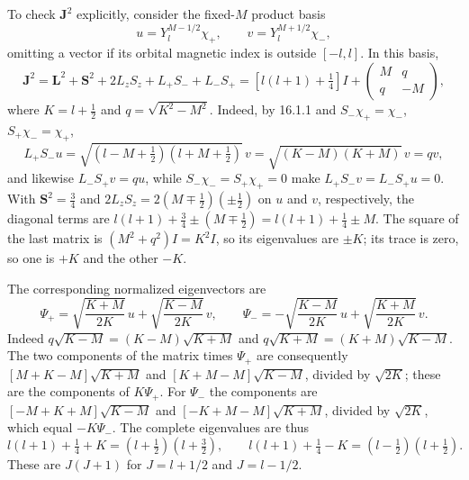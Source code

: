 To check $\mathbf J^2$ explicitly, consider the fixed-$M$ product basis
\[
u=Y_l^{M-1/2}\chi_+,\qquad
v=Y_l^{M+1/2}\chi_-,
\]
omitting a vector if its orbital magnetic index is outside $[-l,l]$.
In this basis,
\[
\mathbf J^2=\mathbf L^2+\mathbf S^2+2L_zS_z+L_+S_-+L_-S_+
=\left[l(l+1)+\tfrac14\right]I+
\begin{pmatrix}M&q\\q&-M\end{pmatrix},
\]
where $K=l+\tfrac12$ and $q=\sqrt{K^2-M^2}$.
Indeed, by 16.1.1 and $S_-\chi_+=\chi_-$, $S_+\chi_-=\chi_+$,
\[
L_+S_-u=\sqrt{(l-M+\tfrac12)(l+M+\tfrac12)}\,v=\sqrt{(K-M)(K+M)}\,v=qv,
\]
and likewise $L_-S_+v=qu$, while $S_-\chi_-=S_+\chi_+=0$ make
$L_+S_-v=L_-S_+u=0$. With $\mathbf S^2=\tfrac34$ and
$2L_zS_z=2(M\mp\tfrac12)(\pm\tfrac12)$ on $u$ and $v$, respectively,
the diagonal terms are
$l(l+1)+\tfrac34\pm(M\mp\tfrac12)=l(l+1)+\tfrac14\pm M$.
The square of the last matrix is
$(M^2+q^2)I=K^2I$, so its eigenvalues are $\pm K$; its trace is zero,
so one is $+K$ and the other $-K$.

The corresponding normalized eigenvectors are
\[
\Psi_+=\sqrt{\frac{K+M}{2K}}\,u+
\sqrt{\frac{K-M}{2K}}\,v,
\qquad
\Psi_-=-\sqrt{\frac{K-M}{2K}}\,u+
\sqrt{\frac{K+M}{2K}}\,v.
\]
Indeed $q\sqrt{K-M}=(K-M)\sqrt{K+M}$ and
$q\sqrt{K+M}=(K+M)\sqrt{K-M}$. The two components of the matrix
times $\Psi_+$ are consequently
$[M+K-M]\sqrt{K+M}$ and $[K+M-M]\sqrt{K-M}$,
divided by $\sqrt{2K}$; these are the components of $K\Psi_+$.
For $\Psi_-$ the components are
$[-M+K+M]\sqrt{K-M}$ and
$[-K+M-M]\sqrt{K+M}$, divided by $\sqrt{2K}$,
which equal $-K\Psi_-$.
The complete eigenvalues are thus
\[
l(l+1)+\tfrac14+K=(l+\tfrac12)(l+\tfrac32),\qquad
l(l+1)+\tfrac14-K=(l-\tfrac12)(l+\tfrac12).
\]
These are $J(J+1)$ for $J=l+1/2$ and $J=l-1/2$.


